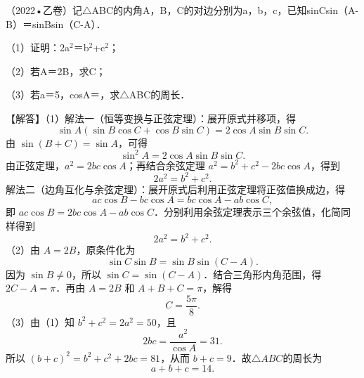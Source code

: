 \begin{question}
（2022•乙卷）记$\triangle$ABC的内角A，B，C的对边分别为a，b，c，已知sinCsin（A-B）＝sinBsin（C-A）．\par
（1）证明：2a$^{2}$＝b$^{2}$+c$^{2}$；\par
（2）若A＝2B，求C；\par
（3）若a＝5，cosA＝\allowbreak{}，求$\triangle$ABC的周长．\par
\begin{solution}
【解答】（1）解法一（恒等变换与正弦定理）：展开原式并移项，得
\[
\sin A(\sin B\cos C+\cos B\sin C)
=2\cos A\sin B\sin C.
\]
由 $\sin(B+C)=\sin A$，可得
\[
\sin^2A=2\cos A\sin B\sin C.
\]
由正弦定理，$a^2=2bc\cos A$；再结合余弦定理
$a^2=b^2+c^2-2bc\cos A$，得到
\[
2a^2=b^2+c^2.
\]
解法二（边角互化与余弦定理）：展开原式后利用正弦定理将正弦值换成边，得
\[
ac\cos B-bc\cos A=bc\cos A-ab\cos C,
\]
即 $ac\cos B=2bc\cos A-ab\cos C$．分别利用余弦定理表示三个余弦值，化简同样得到
\[
2a^2=b^2+c^2.
\]
（2）由 $A=2B$，原条件化为
\[
\sin C\sin B=\sin B\sin(C-A).
\]
因为 $\sin B\ne0$，所以 $\sin C=\sin(C-A)$．结合三角形内角范围，得
$2C-A=\pi$．再由 $A=2B$ 和 $A+B+C=\pi$，解得
\[
C=\frac{5\pi}{8}.
\]
（3）由（1）知 $b^2+c^2=2a^2=50$，且
\[
2bc=\frac{a^2}{\cos A}=31.
\]
所以 $(b+c)^2=b^2+c^2+2bc=81$，从而 $b+c=9$．故$\triangle ABC$的周长为
\[
a+b+c=14.
\]
\end{solution}
\end{question}

